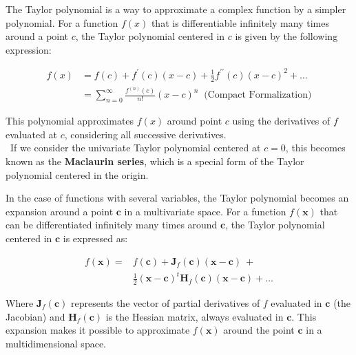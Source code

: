 \documentclass[10pt,a4paper]{Template}
\begin{document}
\begin{minipage}{0.48\textwidth}

\vspace{-1.59cm}



The Taylor polynomial is a way to approximate a complex function by a simpler polynomial. For a function $f(x)$ that is differentiable infinitely many times around a point $c$, the Taylor polynomial centered in $c$ is given by the following expression:

\vspace{-0.5cm}
\[
\begin{aligned}
f(x) & =f(c)+f^{\prime}(c)(x-c)+\frac{1}{2} f^{\prime \prime}(c)(x-c)^{2}+\ldots \\
& =\sum_{n=0}^{\infty} \frac{f^{(n)}(c)}{n !}(x-c)^{n} \;\; \text{(Compact Formalization)}
\end{aligned}
\]

This polynomial approximates $f(x)$ around point $c$ using the derivatives of $f$ evaluated at $c$, considering all successive derivatives. \\

{\small \faLightbulb} \ If we consider the univariate Taylor polynomial centered at $c=0$, this becomes known as the \textbf{Maclaurin series}, which is a special form of the Taylor polynomial centered in the origin.

\divider


In the case of functions with several variables, the Taylor polynomial becomes an expansion around a point $\mathbf{c}$ in a multivariate space. For a function $f(\mathbf{x})$ that can be differentiated infinitely many times around $\mathbf{c}$, the Taylor polynomial centered in $\mathbf{c}$ is expressed as:

\[
\begin{aligned}
f(\mathbf{x})= & f(\mathbf{c})+\mathbf{J}_{f}(\mathbf{c})(\mathbf{x}-\mathbf{c}) \ + \\
& \frac{1}{2}(\mathbf{x}-\mathbf{c})^{t} \mathbf{H}_{f}(\mathbf{c})(\mathbf{x}-\mathbf{c})+\ldots
\end{aligned}
\]

Where $\mathbf{J}_{f}(\mathbf{c})$ represents the vector of partial derivatives of $f$ evaluated in $\mathbf{c}$ (the Jacobian) and $\mathbf{H}_{f}(\mathbf{c})$ is the Hessian matrix, always evaluated in $\mathbf{c}$. This expansion makes it possible to approximate $f(\mathbf{x})$ around the point $\mathbf{c}$ in a multidimensional space.


\end{minipage}
\end{document}
